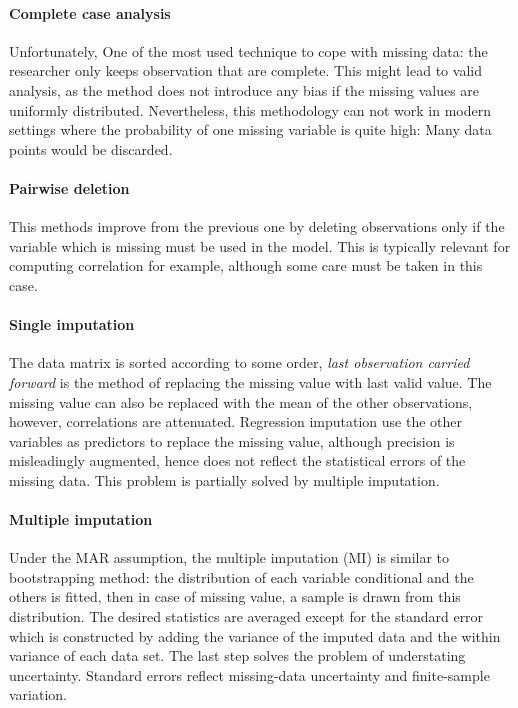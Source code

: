 \paragraph{Complete case analysis}
Unfortunately, One of the most used technique to cope with missing data: the
researcher only keeps observation that are complete. This might lead to valid
analysis, as the method does not introduce any bias if the missing values are
uniformly distributed. Nevertheless, this methodology can not work in modern
settings where the probability of one missing variable is quite high: Many data
points would be discarded.

\paragraph{Pairwise deletion}

This methods improve from the previous one by deleting observations only if the
variable which is missing must be used in the model. This is typically relevant
for computing correlation for example, although some care must be taken in this
case.

\paragraph{Single imputation}

The data matrix is sorted according to some order, \emph{last observation
  carried forward} is the method of replacing the missing value with last valid
value. The missing value can also be replaced with the mean of the other
observations, however, correlations are attenuated. Regression imputation use
the other variables as predictors to replace the missing value, although
precision is misleadingly augmented, hence does not reflect the statistical
errors of the missing data. This problem is partially solved by multiple
imputation.

\paragraph{Multiple imputation}

Under the MAR assumption, the multiple imputation (MI) is similar to
bootstrapping method: the distribution of each variable conditional and the
others is fitted, then in case of missing value, a sample is drawn from this
distribution. The desired statistics are averaged except for the standard error
which is constructed by adding the variance of the imputed data and the within
variance of each data set. The last step solves the problem of understating
uncertainty. Standard errors reflect missing-data uncertainty and finite-sample
variation.

